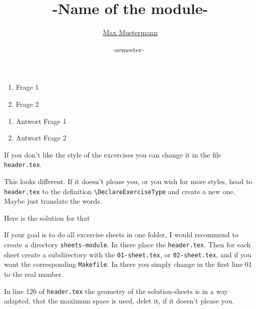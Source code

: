 


\title{-Name of the module-}
\date{-semester-~} %
\author{\href{mailto:max.mustermann@tu-dortmund.de}{Max Mustermann}}


\newcommand{\sheetnumber}{1}


\newcommand{\handindate}{16.10.2019, 10:00 Uhr}

\setcounter{aufgabe}{0}




\begin{aufgabe}[subtitle={Tolle Aufgabe}, points=5]
  \begin{enumerate}
    \item Frage 1
    \item Frage 2
  \end{enumerate}
\end{aufgabe}

\begin{loesung}
  \begin{enumerate}
    \item Antwort Frage 1
    \item Antwort Frage 2
  \end{enumerate}
\end{loesung}

If you don't like the style of the excercises you can change it in the
file \texttt{header.tex}.

\begin{altaufgabe}[subtitle={Another style template}]
  This looks different. If it doesn't please you, or you wish for more styles,
  head to \texttt{header.tex} to the definition
  \texttt{\textbackslash DeclareExerciseType} and create a new one.
  Maybe just translate the words.
\end{altaufgabe}

\begin{altloesung}
  Here is the solution for that
\end{altloesung}

If your goal is to do all excercise sheets in one folder, I would recommend
to create a directory \texttt{sheets-module}.
In there place the \texttt{header.tex}. Then for each sheet create a
subdirectory with the \texttt{01-sheet.tex}, or \texttt{02-sheet.tex},
and if you want the corresponding \texttt{Makefile}.
In there you simply change in the first line 01 to the real number.

In line 126 of \texttt{header.tex} the geometry of the solution-sheets is
in a way adapted, that the maximum space is used,
delet it, if it doesn't please you.

